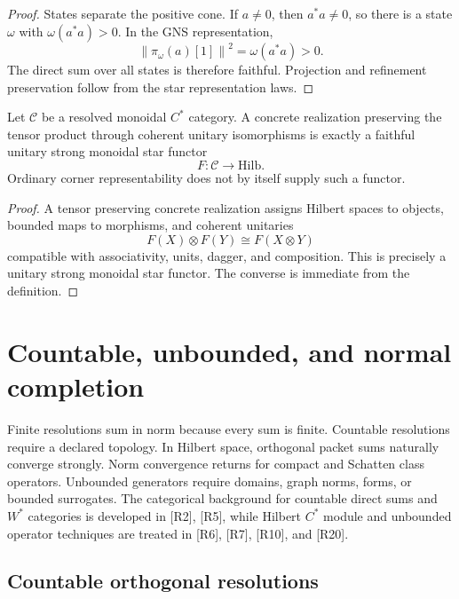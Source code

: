 \documentclass{aomart}
\theoremstyle{definition}
\theoremstyle{remark}
\newcommand{\Ccal}{\mathcal C}
\newcommand{\norm}[1]{\left\lVert#1\right\rVert}
\newcommand{\Rcite}[1]{\textup{[#1]}}
\begin{document}
\begin{proof}
States separate the positive cone. If \(a\ne0\), then \(a^*a\ne0\), so there is a state \(\omega\) with \(\omega(a^*a)>0\). In the GNS representation,
\[
 \norm{\pi_\omega(a)[1]}^2
 =
 \omega(a^*a)>0.
\]
The direct sum over all states is therefore faithful. Projection and refinement preservation follow from the star representation laws.
\end{proof}

\begin{proposition}\label{prop:monoidal_boundary}
Let \(\Ccal\) be a resolved monoidal \(C^*\) category. A concrete realization preserving the tensor product through coherent unitary isomorphisms is exactly a faithful unitary strong monoidal star functor
\[
 F:\Ccal\longrightarrow\mathrm{Hilb}.
\]
Ordinary corner representability does not by itself supply such a functor.
\end{proposition}

\begin{proof}
A tensor preserving concrete realization assigns Hilbert spaces to objects, bounded maps to morphisms, and coherent unitaries
\[
 F(X)\otimes F(Y)\cong F(X\otimes Y)
\]
compatible with associativity, units, dagger, and composition. This is precisely a unitary strong monoidal star functor. The converse is immediate from the definition.
\end{proof}

\section{Countable, unbounded, and normal completion}\label{sec:countable}

Finite resolutions sum in norm because every sum is finite. Countable resolutions require a declared topology. In Hilbert space, orthogonal packet sums naturally converge strongly. Norm convergence returns for compact and Schatten class operators. Unbounded generators require domains, graph norms, forms, or bounded surrogates. The categorical background for countable direct sums and \(W^*\) categories is developed in \Rcite{R2}, \Rcite{R5}, while Hilbert \(C^*\) module and unbounded operator techniques are treated in \Rcite{R6}, \Rcite{R7}, \Rcite{R10}, and \Rcite{R20}.

\subsection{Countable orthogonal resolutions}
\end{document}
